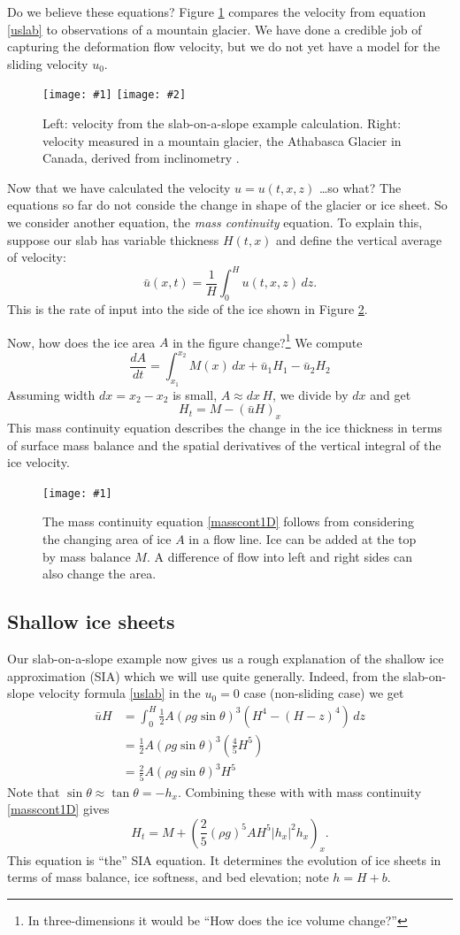 \documentclass[titlepage,letterpaper,final,12pt]{scrartcl}
\newcommand{\onefig}[2]{
\begin{figure}[ht]
\centering
\texttt{[image: \#1]}
\caption{#2}
\label{fig:#1}
\end{figure}}
\newcommand{\twofigsizes}[5]{
\begin{figure}[ht]
\centering
\texttt{[image: \#1]} \quad
\texttt{[image: \#2]}
\caption{#3}
\label{fig:#1}
\end{figure}}
\begin{document}
Do we believe these equations?  Figure \ref{fig:slabvel} compares the velocity from equation \eqref{uslab} to observations of a mountain glacier.  We have done a credible job of capturing the deformation flow velocity, but we do not yet have a model for the sliding velocity $u_0$.  

\twofigsizes{slabvel}{athabasca_deform}{Left: velocity from the slab-on-a-slope example calculation.  Right: velocity measured in a mountain glacier, the Athabasca Glacier in Canada, derived from inclinometry \cite{SavagePaterson}.}{2.7in}{2.3in}

Now that we have calculated the velocity $u=u(t,x,z)$ \dots so what?  The equations so far do not conside the change in shape of the glacier or ice sheet.  So we consider another equation, the \emph{mass continuity} equation.  To explain this, suppose our slab has variable thickness $H(t,x)$ and define the vertical average of velocity:
	$$\bar u(x,t) = \frac{1}{H}\int_0^{H} u(t,x,z)\,dz.$$
This is the rate of input into the side of the ice shown in Figure \ref{fig:slabmasscontfig}.

Now, how does the ice area $A$ in the figure change?\footnote{In three-dimensions it would be ``How does the ice volume change?''}  We compute
	$$\frac{dA}{dt} = \int_{x_1}^{x_2} M(x)\,dx + \bar u_1 H_1 - \bar u_2 H_2$$
Assuming width $dx=x_2-x_2$ is small, $A\approx dx\, H$, we divide by $dx$ and get
\begin{equation}
H_t = M - \left(\bar u H\right)_x \label{masscont1D}
\end{equation}
This mass continuity equation describes the change in the ice thickness in terms of surface mass balance and the spatial derivatives of the vertical integral of the ice velocity.

\onefig{slabmasscontfig}{The mass continuity equation \eqref{masscont1D} follows from considering the changing area of ice $A$ in a flow line.  Ice can be added at the top by mass balance $M$.  A difference of flow into left and right sides can also change the area.}


\subsection{Shallow ice sheets}  Our slab-on-a-slope example now gives us a rough explanation of the shallow ice approximation (SIA) which we will use quite generally.  Indeed, from the slab-on-slope velocity formula \eqref{uslab} in the $u_0=0$ case (non-sliding case) we get
\begin{align*}
\bar u H &= \int_0^H \frac{1}{2} A (\rho g \sin\theta)^3  \left(H^4 - (H-z)^4\right)\,dz \\
	&= \frac{1}{2} A (\rho g \sin\theta)^3  \left(\frac{4}{5} H^5\right) \\
	&= \frac{2}{5} A (\rho g \sin\theta)^3 H^5
\end{align*}
Note that $\sin \theta \approx \tan\theta = - h_x$.  Combining these with with mass continuity \eqref{masscont1D} gives
  $$H_t = M + \left(\frac{2}{5} (\rho g)^5 A H^5 |h_x|^2 h_x\right)_x.$$
This equation is ``the'' SIA equation.  It determines the evolution of ice sheets in terms of 
mass balance, ice softness, and bed elevation; note $h=H+b$.  
\end{document}
